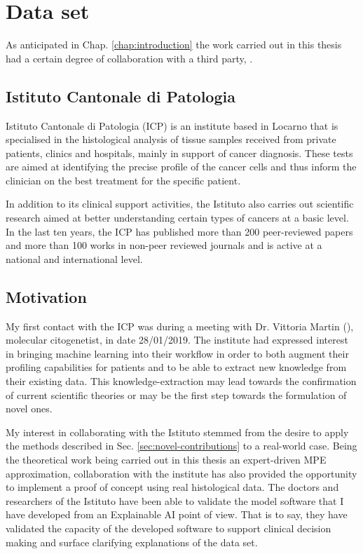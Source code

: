 
\section{Data set}
As anticipated in Chap. \ref{chap:introduction} the work carried out in this thesis had a certain degree of collaboration with a third party, \cite{istitutocantonalepresentazione}.

\subsection{Istituto Cantonale di Patologia}
Istituto Cantonale di Patologia (ICP) is an institute based in Locarno that is specialised in the histological analysis of tissue samples received from private patients, clinics and hospitals, mainly in support of cancer diagnosis.
These tests are aimed at identifying the precise profile of the cancer cells and thus inform the clinician on the best treatment for the specific patient.

In addition to its clinical support activities, the Istituto also carries out scientific research aimed at better understanding certain types of cancers at a basic level.
In the last ten years, the ICP has published more than 200 peer-reviewed papers and more than 100 works in non-peer reviewed journals and is active at a national and international level.

\subsection{Motivation}
My first contact with the ICP was during a meeting with Dr. Vittoria Martin (\cite{martin2012}), molecular citogenetist, in date 28/01/2019.
The institute had expressed interest in bringing machine learning into their workflow in order to both augment their profiling capabilities for patients and to be able to extract new knowledge from their existing data.
This knowledge-extraction may lead towards the confirmation of current scientific theories or may be the first step towards the formulation of novel ones.


My interest in collaborating with the Istituto stemmed from the desire to apply the methods described in Sec. \ref{sec:novel-contributions} to a real-world case.
Being the theoretical work being carried out in this thesis an expert-driven MPE approximation, collaboration with the institute has also provided the opportunity to implement a proof of concept using real histological data.
The doctors and researchers of the Istituto have been able to validate the model software that I have developed from an Explainable AI point of view.
That is to say, they have validated the capacity of the developed software to support clinical decision making and surface clarifying explanations of the data set.

